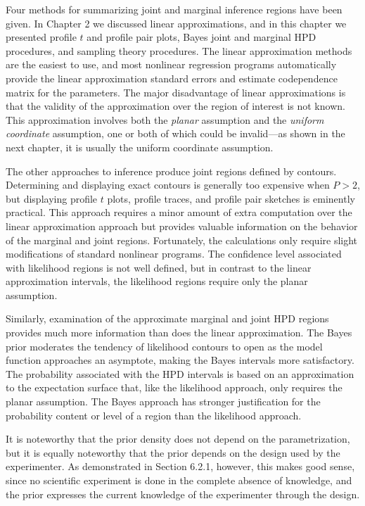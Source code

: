 Four methods for summarizing joint and marginal inference regions
have been given.
In Chapter 2 we discussed linear approximations, and in this chapter
we presented profile $t$ and profile pair plots,
Bayes joint and marginal HPD procedures, and sampling theory procedures.
The linear approximation methods are the easiest to use, and
most nonlinear regression programs automatically provide the linear
approximation standard errors and estimate codependence matrix 
for the parameters.
The major disadvantage of linear approximations is that the validity
of the approximation over the region of interest is not known.
This approximation involves both the {\em planar\/}
assumption and the
{\em uniform coordinate\/}
assumption, one or both of which could be invalid---as shown in the
next chapter, it is usually the uniform coordinate 
assumption.

The other approaches to inference produce joint regions
defined by contours.
Determining and displaying exact contours is generally too
expensive when $P > 2$,
but displaying profile $t$ plots, profile traces, and profile pair
sketches is eminently practical.
This approach requires a minor amount of extra
computation over the linear approximation approach but provides
valuable information on the behavior of the marginal and joint regions.
Fortunately, the calculations only require slight modifications of
standard nonlinear programs.
The confidence level associated with likelihood regions is
not well defined, but in
contrast to the linear approximation intervals, the likelihood regions
require only the planar assumption.

Similarly, examination of the approximate marginal and joint
HPD regions provides much more information than does
the linear approximation.
The Bayes prior moderates the tendency of likelihood contours to open
as the model function approaches an asymptote, making the Bayes
intervals more satisfactory.
The probability associated with the HPD intervals is
based on an approximation to the expectation surface that, like
the likelihood approach, only requires the planar assumption.
The Bayes approach has stronger justification for the
probability content or level of a region than the likelihood approach.

It is noteworthy that the prior density does not depend on the
parametrization, but it is equally noteworthy that the prior
depends on the design used by the experimenter.
As demonstrated in Section 6.2.1, however,
this makes good sense, since no scientific experiment is done in
the complete absence of knowledge, and the prior expresses
the current knowledge of the experimenter through the design.

